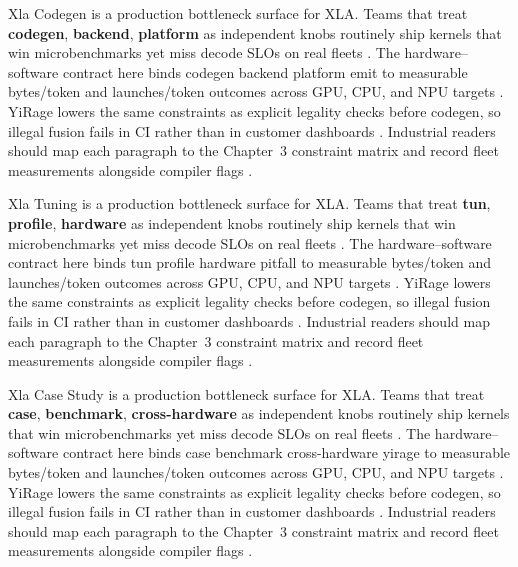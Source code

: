 Xla Codegen is a production bottleneck surface for XLA. Teams that treat \textbf{codegen}, \textbf{backend}, \textbf{platform} as independent knobs routinely ship kernels that win microbenchmarks yet miss decode SLOs on real fleets \citep{semianalysis2024tma,dlbook}. The hardware--software contract here binds codegen backend platform emit to measurable bytes/token and launches/token outcomes across GPU, CPU, and NPU targets \citep{amd2024xdna,dao2022flashattention}. YiRage lowers the same constraints as explicit legality checks before codegen, so illegal fusion fails in CI rather than in customer dashboards \citep{amd2024aie,kwon2023vllm}. Industrial readers should map each paragraph to the Chapter~3 constraint matrix and record fleet measurements alongside compiler flags \citep{dlbook,nvidia2024cudagraphs}.

Xla Tuning is a production bottleneck surface for XLA. Teams that treat \textbf{tun}, \textbf{profile}, \textbf{hardware} as independent knobs routinely ship kernels that win microbenchmarks yet miss decode SLOs on real fleets \citep{amd2024xdna,dao2022flashattention}. The hardware--software contract here binds tun profile hardware pitfall to measurable bytes/token and launches/token outcomes across GPU, CPU, and NPU targets \citep{amd2024aie,kwon2023vllm}. YiRage lowers the same constraints as explicit legality checks before codegen, so illegal fusion fails in CI rather than in customer dashboards \citep{dlbook,nvidia2024cudagraphs}. Industrial readers should map each paragraph to the Chapter~3 constraint matrix and record fleet measurements alongside compiler flags \citep{dao2022flashattention,liu2024deepseekv3}.

Xla Case Study is a production bottleneck surface for XLA. Teams that treat \textbf{case}, \textbf{benchmark}, \textbf{cross-hardware} as independent knobs routinely ship kernels that win microbenchmarks yet miss decode SLOs on real fleets \citep{amd2024aie,kwon2023vllm}. The hardware--software contract here binds case benchmark cross-hardware yirage to measurable bytes/token and launches/token outcomes across GPU, CPU, and NPU targets \citep{dlbook,nvidia2024cudagraphs}. YiRage lowers the same constraints as explicit legality checks before codegen, so illegal fusion fails in CI rather than in customer dashboards \citep{dao2022flashattention,liu2024deepseekv3}. Industrial readers should map each paragraph to the Chapter~3 constraint matrix and record fleet measurements alongside compiler flags \citep{kwon2023vllm,patel2025llminference}.

